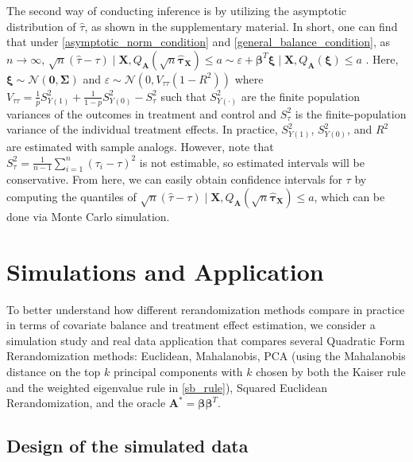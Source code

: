 \documentclass[11pt,twoside]{article}
\theoremstyle{definition}
\theoremstyle{remark}
\begin{document}
The second way of conducting inference is by utilizing the asymptotic distribution of $\widehat{\tau}$, as shown in the supplementary material. In short, one can find that under \cref{asymptotic_norm_condition} and \cref{general_balance_condition}, as $n \to \infty$, 
$\sqrt{n}(\widehat{\tau} - \tau) \mid \mathbf{X}, Q_{\mathbf{A}}(\sqrt{n} \widehat{\bm{\tau}}_{\mathbf{X}}) \leq a \sim \varepsilon + \bm{\beta}^T \bm{\xi} \mid \mathbf{X},  Q_{\mathbf{A}}(\bm{\xi}) \leq a$ \citep{li2018asymptotic}. Here, $\bm{\xi} \sim \mathcal{N}(\mathbf{0}, \mathbf{\Sigma})$ and $\varepsilon \sim \mathcal{N}(0, V_{\tau \tau}(1 - R^2))$ where $V_{\tau \tau} = \frac{1}{p} S^2_{Y(1)} + \frac{1}{1-p} S^2_{Y(0)} - S^2_\tau$ such that $S^2_{Y(\cdot)}$ are the finite population variances of the outcomes in treatment and control and $S^2_\tau$ is the finite-population variance of the individual treatment effects. In practice, $S^2_{Y(1)}$, $S^2_{Y(0)}$, and $R^2$ are estimated with sample analogs. However, note that $S^2_{\tau} = \frac{1}{n-1} \sum^n_{i=1}(\tau_i - \tau )^2$ is not estimable, so estimated intervals will be conservative. From here, we can easily obtain confidence intervals for $\tau$ by computing the quantiles of $\sqrt{n} \left(\widehat{\tau} - \tau \right) \mid \mathbf{X}, Q_{\mathbf{A}}(\sqrt{n} \widehat{\bm{\tau}}_{\mathbf{X}}) \leq a$, which can be done via Monte Carlo simulation.

\section{Simulations and Application} \label{simulations}

To better understand how different rerandomization methods compare in practice in terms of covariate balance and treatment effect estimation, we consider a simulation study and real data application that compares several Quadratic Form Rerandomization methods: Euclidean, Mahalanobis, PCA (using the Mahalanobis distance on the top $k$ principal components with $k$ chosen by both the Kaiser rule and the weighted eigenvalue rule in \cref{sb_rule}), Squared Euclidean Rerandomization, and the oracle $\mathbf{A}^* = \bm{\beta} \bm{\beta}^T$.

\subsection{Design of the simulated data} \label{sim_data_def}
\end{document}
